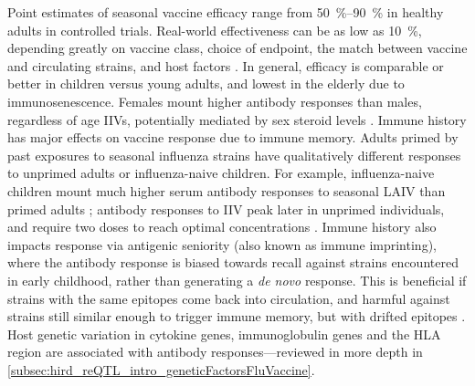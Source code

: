 Point estimates of seasonal vaccine efficacy range from \SIrange{50}{90}{\percent} in healthy adults in controlled trials.
Real-world effectiveness can be as low as \SI{10}{\percent}, depending greatly on vaccine class, choice of endpoint, the match between vaccine and circulating strains, and host factors
\autocite{dhakal2019HostFactorsImpact,zimmermann2019FactorsThatInfluence}.
In general, efficacy is comparable or better in children versus young adults, and lowest in the elderly due to immunosenescence.
Females mount higher antibody responses than males, regardless of age \glspl{IIV}, potentially mediated by sex steroid levels \autocite{furman2014SystemsAnalysisSex,dhakal2019HostFactorsImpact}.
Immune history has major effects on vaccine response due to immune memory.
Adults primed by past exposures to seasonal influenza strains have qualitatively different responses to unprimed adults or influenza-naive children.
For example, 
influenza-naive children mount much higher serum antibody responses to seasonal \gls{LAIV} than primed adults \autocite{luke2018InfluenzaVaccineLive};
antibody responses to \gls{IIV} peak later in unprimed individuals, and require two doses to reach optimal concentrations \autocite{bresee2018InactivatedInfluenzaVaccines}.
Immune history also impacts response via antigenic seniority (also known as immune imprinting), 
where the antibody response is biased towards recall against strains encountered in early childhood,
rather than generating a \textit{de novo} response.
This is beneficial if strains with the same epitopes come back into circulation, 
and harmful against strains still similar enough to trigger immune memory, but with drifted epitopes \autocite{henry2018OriginalAntigenicSin,dhakal2019HostFactorsImpact}.
Host genetic variation in cytokine genes, immunoglobulin genes and the \gls{HLA} region are associated with antibody responses---reviewed in more depth in \cref{subsec:hird_reQTL_intro_geneticFactorsFluVaccine}.


